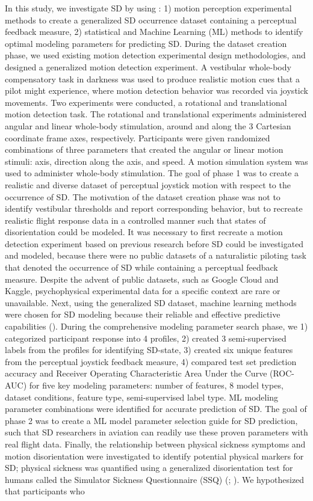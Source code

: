 \documentclass[11pt, onecolumn]{article}
\begin{document}
In this study, we investigate SD by using : 1) motion perception experimental methods to create a generalized SD occurrence dataset containing a perceptual feedback measure, 2) statistical and Machine Learning (ML) methods to identify optimal modeling parameters for predicting SD.  During the dataset creation phase, we used existing motion detection experimental design methodologies, and designed a generalized motion detection experiment.  A vestibular whole-body compensatory task in darkness was used to produce realistic motion cues that a pilot might experience, where motion detection behavior was recorded via joystick movements.  Two experiments were conducted, a rotational and translational motion detection task.  The rotational and translational experiments administered angular and linear whole-body stimulation, around and along the 3 Cartesian coordinate frame axes, respectively.  Participants were given randomized combinations of three parameters that created the angular or linear motion stimuli: axis, direction along the axis, and speed.  A motion simulation system was used to administer whole-body stimulation.  The goal of phase 1 was to create a realistic and diverse dataset of perceptual joystick motion with respect to the occurrence of SD.  The motivation of the dataset creation phase was not to identify vestibular thresholds and report corresponding behavior, but to recreate realistic flight response data in a controlled manner such that states of disorientation could be modeled.  It was necessary to first recreate a motion detection experiment based on previous research before SD could be investigated and modeled, because there were no public datasets of a naturalistic piloting task that denoted the occurrence of SD while containing a perceptual feedback measure.  Despite the advent of public datasets, such as Google Cloud and Kaggle, psychophysical experimental data for a specific context are rare or unavailable.  Next, using the generalized SD dataset, machine learning methods were chosen for SD modeling because their reliable and effective predictive capabilities (\cite{Burkov_2019_ML}).  During the comprehensive modeling parameter search phase, we 1) categorized participant response into 4 profiles, 2) created 3 semi-supervised labels from the profiles for identifying SD-state, 3) created six unique features from the perceptual joystick feedback measure, 4) compared test set prediction accuracy and Receiver Operating Characteristic Area Under the Curve (ROC-AUC) for five key modeling parameters: number of features, 8 model types, dataset conditions, feature type, semi-supervised label type.  ML modeling parameter combinations were identified for accurate prediction of SD.  The goal of phase 2 was to create a ML model parameter selection guide for SD prediction, such that SD researchers in aviation can readily use these proven parameters with real flight data.  Finally, the relationship between physical sickness symptoms and motion disorientation were investigated to identify potential physical markers for SD; physical sickness was quantified using a generalized disorientation test for humans called the Simulator Sickness Questionnaire (SSQ) (\cite{Kennedy_1993_Simulator}; \cite{Bouchard_2007_SimulatorSickness}).  We hypothesized that participants who 
\end{document}
